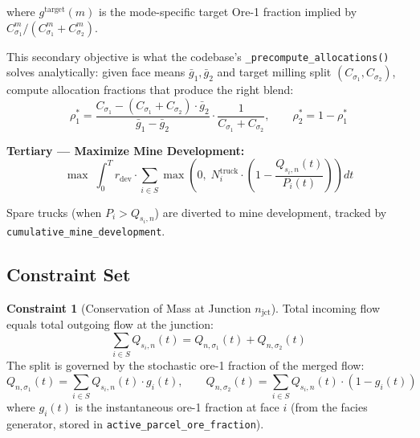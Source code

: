 \documentclass[11pt,a4paper]{article}
\theoremstyle{definition}
\newtheorem{constraint}{Constraint}[section]
\begin{document}
where $g^{\text{target}}(m)$ is the mode-specific target Ore-1 fraction implied by
$C^m_{\sigma_1} / (C^m_{\sigma_1} + C^m_{\sigma_2})$.

This secondary objective is what the codebase's \texttt{\_precompute\_allocations()}
solves analytically: given face means $\bar{g}_1, \bar{g}_2$ and target milling
split $(C_{\sigma_1}, C_{\sigma_2})$, compute allocation fractions that produce
the right blend:
\begin{equation}
  \rho_1^* = \frac{C_{\sigma_1} - (C_{\sigma_1} + C_{\sigma_2}) \cdot \bar{g}_2}
                   {\bar{g}_1 - \bar{g}_2}
  \cdot \frac{1}{C_{\sigma_1} + C_{\sigma_2}},
  \qquad
  \rho_2^* = 1 - \rho_1^*
  \label{eq:blend-solve}
\end{equation}

\medskip
\noindent\textbf{Tertiary — Maximize Mine Development:}
\begin{equation}
  \max \; \int_0^T r_{\text{dev}} \cdot \sum_{i \in S}
    \max\!\left(0, \;
      N_i^{\text{truck}} \cdot \left(1 - \frac{Q_{s_i,n}(t)}{P_i(t)}\right)
    \right) dt
  \label{eq:obj-development}
\end{equation}

Spare trucks (when $P_i > Q_{s_i,n}$) are diverted to mine development, tracked
by \texttt{cumulative\_mine\_development}.

\subsection{Constraint Set}

\begin{constraint}[Conservation of Mass at Junction $n_{\text{jct}}$]
\label{con:mass-junction}
Total incoming flow equals total outgoing flow at the junction:
\begin{equation}
  \sum_{i \in S} Q_{s_i, n}(t) = Q_{n,\sigma_1}(t) + Q_{n,\sigma_2}(t)
\end{equation}
The split is governed by the stochastic ore-1 fraction of the merged flow:
\begin{equation}
  Q_{n,\sigma_1}(t) = \sum_{i \in S} Q_{s_i,n}(t) \cdot g_i(t), \qquad
  Q_{n,\sigma_2}(t) = \sum_{i \in S} Q_{s_i,n}(t) \cdot (1 - g_i(t))
\end{equation}
where $g_i(t)$ is the instantaneous ore-1 fraction at face $i$ (from the
facies generator, stored in \texttt{active\_parcel\_ore\_fraction}).
\end{constraint}
\end{document}
